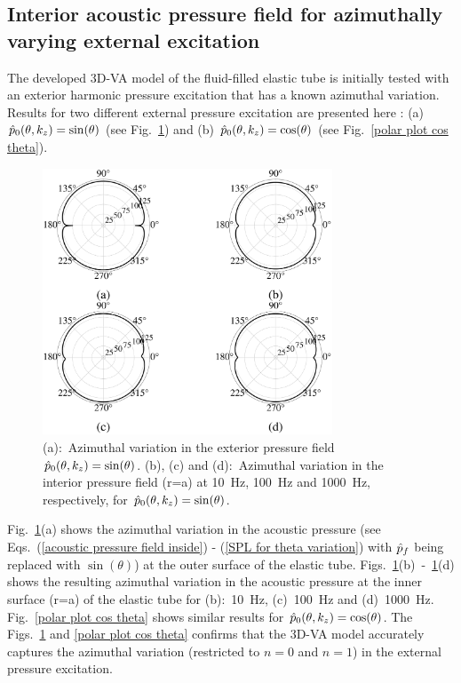 \documentclass[11pt,cleanfoot]{asme2ej}
\begin{document}
\subsection{Interior acoustic pressure field for azimuthally varying external excitation}
\label{azimuthal excitation}
The developed 3D-VA model of the fluid-filled elastic tube is initially tested with an exterior harmonic pressure excitation that has a known azimuthal variation. Results for two different external pressure excitation are presented here : (a) $\Hat{p}_0(\theta,k_z) = \sin(\theta)$ (see Fig.~\ref{polar plot sin theta}) and (b) $\Hat{p}_0(\theta,k_z) = \cos(\theta)$ (see Fig.~\ref{polar plot cos theta}).


\begin{figure}[ht]
    \centering
    \includegraphics[width=3.4in]{polarplot_sin_theta.eps}
    \caption{(a):~Azimuthal variation in the exterior pressure field $\Hat{p}_0(\theta,k_z) =\sin(\theta)$. (b), (c) and (d):~Azimuthal variation in the interior pressure field (r=a) at 10~Hz, 100~Hz and 1000~Hz, respectively, for $\Hat{p}_0(\theta,k_z) =\sin(\theta)$.}
    \label{polar plot sin theta}
\end{figure}

Fig.~\ref{polar plot sin theta}(a) shows the azimuthal variation in the acoustic pressure (see Eqs.~(\ref{acoustic pressure field inside}) - (\ref{SPL for theta variation}) with $\Hat{p}_f$ being replaced with $\sin(\theta)$) at the outer surface of the elastic tube. Figs.~\ref{polar plot sin theta}(b)~-~\ref{polar plot sin theta}(d) shows the resulting azimuthal variation in the acoustic pressure at the inner surface (r=a) of the elastic tube for (b):~10~Hz, (c)~100~Hz and (d)~1000~Hz. Fig.~\ref{polar plot cos theta} shows similar results for $\Hat{p}_0(\theta,k_z) = \cos(\theta)$. The Figs.~\ref{polar plot sin theta} and \ref{polar plot cos theta}
confirms that the 3D-VA model accurately captures the azimuthal variation (restricted to $n=0$ and $n=1$) in the external pressure excitation.
\end{document}
